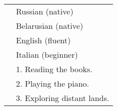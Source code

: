 \documentclass[letterpaper, 11pt]{article}
\begin{document}
\begin{longtable}{p{1.3in}p{4.8in}}

{\color{OliveGreen}{Languages}} 
& Russian (native) \\
& Belarusian (native) \\
& English (fluent) \\
& Italian (beginner)
& \\


\nohyphens{\color{OliveGreen}{Other interests}} 
& 1. Reading the books. \\
& 2. Playing the piano. \\
& 3. Exploring distant lands.\\


\end{longtable}
\end{document}
